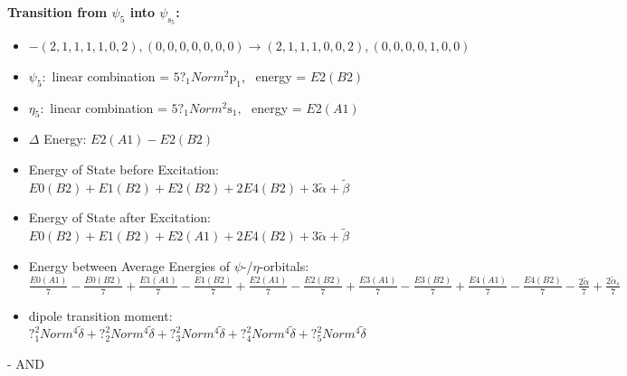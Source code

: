 \documentclass[12pt,a4paper]{article}
\begin{document}
        \noindent\textbf{Transition from $\psi_{5}$ into $\psi_{\text{s}_{5}}$:}
        \begin{itemize}
            \item $- (2, 1, 1, 1, 1, 0, 2), (0, 0, 0, 0, 0, 0, 0) \rightarrow (2, 1, 1, 1, 0, 0, 2), (0, 0, 0, 0, 1, 0, 0)$
        
            \item $\psi_{5}:$ linear combination = $5 ?_{1} Norm^{2} \text{p}_{1}$, \
            energy = $E2(B2)$
            
            \item $\eta_{5}:$ linear combination = $5 ?_{1} Norm^{2} \text{s}_{1}$, \
            energy = $E2(A1)$
            
                \item $\Delta$ Energy: $E2(A1) - E2(B2)$
                \item Energy of State before Excitation: $E0(B2) + E1(B2) + E2(B2) + 2 E4(B2) + 3 \tilde{\alpha} + \tilde{\beta}$
                \item Energy of State after Excitation: $E0(B2) + E1(B2) + E2(A1) + 2 E4(B2) + 3 \tilde{\alpha} + \tilde{\beta}$
                \item Energy between Average Energies of $\psi$-/$\eta$-orbitals: $\frac{E0(A1)}{7} - \frac{E0(B2)}{7} + \frac{E1(A1)}{7} - \frac{E1(B2)}{7} + \frac{E2(A1)}{7} - \frac{E2(B2)}{7} + \frac{E3(A1)}{7} - \frac{E3(B2)}{7} + \frac{E4(A1)}{7} - \frac{E4(B2)}{7} - \frac{2 \tilde{\alpha}}{7} + \frac{2 \tilde{\alpha}_{s}}{7}$
            
            \item dipole transition moment: $?_{1}^{2} Norm^{4} \tilde{\delta} + ?_{2}^{2} Norm^{4} \tilde{\delta} + ?_{3}^{2} Norm^{4} \tilde{\delta} + ?_{4}^{2} Norm^{4} \tilde{\delta} + ?_{5}^{2} Norm^{4} \tilde{\delta}$
        
        \end{itemize}
        
 -  AND 
\end{document}
